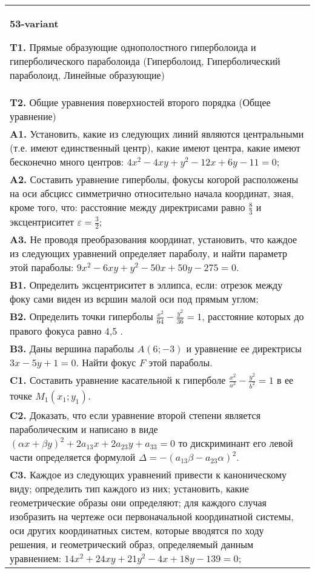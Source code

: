 \documentclass{article}
\begin{document}
\begin{tabular}{m{17cm}}
\textbf{53-variant}
\newline

\textbf{T1.} Прямые образующие однополостного гиперболоида и гиперболического параболоида (Гиперболоид, Гиперболический параболоид, Линейные образующие) \\
\textbf{T2.} Общие уравнения поверхностей второго порядка (Общее уравнение) \\
\textbf{A1.} Установить, какие из следующих линий являются центральными (т.е. имеют единственный центр), какие имеют центра, какие имеют бесконечно много центров: $4 x^2-4 x y+y^2-12 x+6 y-11=0$; \\
\textbf{A2.} Составить уравнение гиперболы, фокусы когорой расположены на оси абсцисс симметрично относительно начала координат, зная, кроме того, что: расстояние между директрисами равно $\frac{8}{3}$ и эксцентриситет $\varepsilon=\frac{3}{2}$; \\
\textbf{A3.} Не проводя преобразования координат, установить, что каждое из следующих уравнений определяет параболу, и найти параметр этой параболы: $9 x^2-6 x y+y^2-50 x+50 y-275=0$. \\
\textbf{B1.} Определить эксцентриситет в эллипса, если: отрезок между фоку сами виден из вєршин малой оси под прямым углом; \\
\textbf{B2.} Определить точки гиперболы $\frac{x^2}{64}-\frac{y^2}{36}=1$, расстояние которых до правого фокуса равно 4,5 . \\
\textbf{B3.} Даны вершина параболы $A(6 ;-3)$ и уравнение ее директрисы $3 x-5 y+1=0$. Найти фокус $F$ этой параболы. \\
\textbf{C1.} Составить уравнение касательной к гиперболе $\frac{x^2}{a^2}-\frac{y^2}{b^2}=1$ в ее точке $M_1\left(x_1 ; y_1\right)$. \\
\textbf{C2.} Доказать, что если уравнение второй степени является параболическим и написано в виде $ (\alpha x+\beta y) ^2+2a_{13}x+2a_{23}y+a_{33}=0$ то дискриминант его левой части определяется формулой $\Delta=- (a_{13} \beta-a_{23} \alpha) ^2$. \\
\textbf{C3.} Каждое из следующих уравнений привести к каноническому виду; определить тип каждого из них; установить, какие геометрические образы они определяют; для каждого случая изобразить на чертеже оси первоначальной координатной системы, оси других координатных систем, которые вводятся по ходу решения, и геометрический образ, определяемый данным уравнением: $14 x^2+24 x y+21 y^2-4 x+18 y-139=0$; \\

\end{tabular}
\vspace{1cm}
\end{document}
